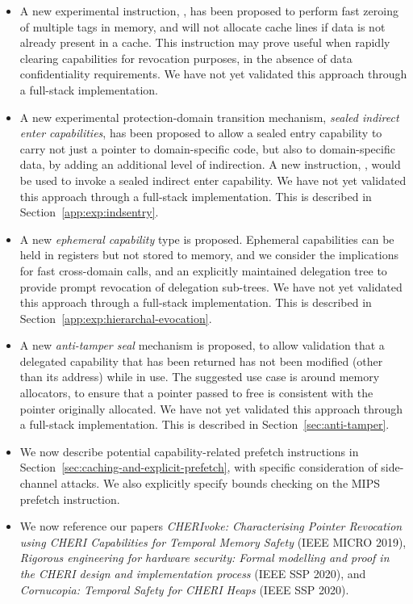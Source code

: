 \begin{itemize}
\item A new experimental instruction, , has been proposed
  to perform fast zeroing of multiple tags in memory, and will not allocate
  cache lines if data is not already present in a cache.
  This instruction may prove useful when rapidly clearing capabilities for
  revocation purposes, in the absence of data confidentiality requirements.
  We have not yet validated this approach through a full-stack implementation.

\item A new experimental protection-domain transition mechanism,
  \textit{sealed indirect enter capabilities}, has been proposed to allow
  a sealed entry capability to carry not just a pointer to domain-specific
  code, but also to domain-specific data, by adding an additional level of
  indirection.
  A new instruction, , would be used to invoke a
  sealed indirect enter capability.
  We have not yet validated this approach through a full-stack implementation.
  This is described in Section~\ref{app:exp:indsentry}.

\item A new \emph{ephemeral capability} type is proposed.
  Ephemeral capabilities can be held in registers but not stored to memory,
  and we consider the implications for fast cross-domain calls, and an
  explicitly maintained delegation tree to provide prompt revocation of
  delegation sub-trees.
  We have not yet validated this approach through a full-stack implementation.
  This is described in Section~\ref{app:exp:hierarchal-evocation}.

\item A new \emph{anti-tamper seal} mechanism is proposed, to allow
  validation that a delegated capability that has been returned has not been
  modified (other than its address) while in use.
  The suggested use case is around memory allocators, to ensure that a pointer
  passed to free is consistent with the pointer originally allocated.
  We have not yet validated this approach through a full-stack implementation.
  This is described in Section~\ref{sec:anti-tamper}.

\item We now describe potential capability-related prefetch instructions in
  Section~\ref{sec:caching-and-explicit-prefetch}, with specific
  consideration of side-channel attacks.
  We also explicitly specify \DDC{} bounds checking on the MIPS
   prefetch instruction.

\item We now reference our papers \textit{CHERIvoke: Characterising Pointer
  Revocation using CHERI Capabilities for Temporal Memory Safety} (IEEE MICRO
  2019), \textit{Rigorous engineering for hardware security: Formal modelling
  and proof in the CHERI design and implementation process} (IEEE SSP 2020),
  and \textit{Cornucopia: Temporal Safety for CHERI Heaps} (IEEE SSP 2020).

\end{itemize}

